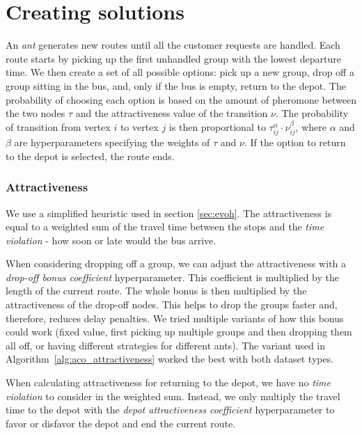 \section{Creating solutions}

An \textit{ant} generates new routes until all the customer requests are handled. Each route starts by picking up the first unhandled group with the lowest departure time. We then create a set of all possible options: pick up a new group, drop off a group sitting in the bus, and, only if the bus is empty, return to the depot. The probability of choosing each option is based on the amount of pheromone between the two nodes $\tau$ and the attractiveness value of the transition $\nu$. The probability of transition from vertex $i$ to vertex $j$ is then proportional to $\tau_{ij}^\alpha \cdot \nu_{ij}^\beta$, where $\alpha$ and $\beta$ are hyperparameters specifying the weights of $\tau$ and $\nu$. If the option to return to the depot is selected, the route ends.

\subsubsection{Attractiveness}\label{sec:attractiveness}

We use a simplified heuristic used in section \ref{sec:evoh}. The attractiveness is equal to a weighted sum of the travel time between the stops and the \textit{time violation} - how soon or late would the bus arrive.

When considering dropping off a group, we can adjust the attractiveness with a \textit{drop-off bonus coefficient} hyperparameter. This coefficient is multiplied by the length of the current route. The whole bonus is then multiplied by the attractiveness of the drop-off nodes. This helps to drop the groups faster and, therefore, reduces delay penalties. We tried multiple variants of how this bonus could work (fixed value, first picking up multiple groups and then dropping them all off, or having different strategies for different ants). The variant used in Algorithm~\ref{alg:aco_attractiveness} worked the best with both dataset types.

When calculating attractiveness for returning to the depot, we have no \textit{time violation} to consider in the weighted sum. Instead, we only multiply the travel time to the depot with the \textit{depot attractiveness coefficient} hyperparameter to favor or disfavor the depot and end the current route.


